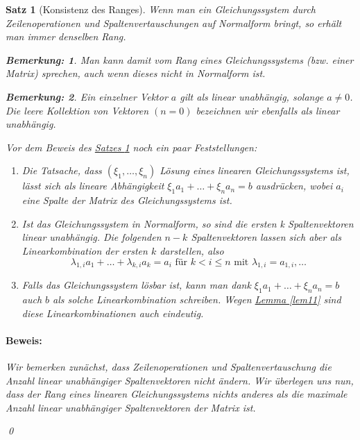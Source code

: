 \documentclass{report}
\newcommand{\lb}{\lambda}
\theoremstyle{customrem}
\newtheorem*{bemerkung}{Bemerkung\textnormal:}
\theoremstyle{customdef}
\newtheorem{satz}[definition]{Satz}
\renewenvironment{proof}{\paragraph{Beweis: }}{\qed}
\theoremstyle{customenv}
\begin{document}
	\begin{satz}[Konsistenz des Ranges]
		\label{satz12}
		Wenn man ein Gleichungssystem durch Zeilenoperationen und Spaltenvertauschungen auf Normalform bringt, so erhält man immer denselben Rang.\\
		
		\begin{bemerkung}
			Man kann damit vom Rang eines Gleichungssystems (bzw. einer Matrix) sprechen, auch wenn dieses nicht in Normalform ist.
		\end{bemerkung}
		\begin{bemerkung}
			Ein einzelner Vektor \(a\) gilt als linear unabhängig, solange \(a \neq 0\). Die leere Kollektion von Vektoren \((n=0)\) bezeichnen wir ebenfalls als linear unabhängig.\\
		\end{bemerkung}
		
		 Vor dem Beweis des \hyperref[satz12]{Satzes \ref*{satz12}} noch ein paar Feststellungen:
		\begin{enumerate}
			\item Die Tatsache, dass \((\xi_1, \ldots, \xi_n)\) Lösung eines linearen Gleichungssystems ist, lässt sich als lineare Abhängigkeit 
			\(\xi_1a_1 + \ldots + \xi_n a_n = b\) ausdrücken, wobei \(a_i\) eine Spalte der Matrix des Gleichungssystems ist.
			\item Ist das Gleichungssystem in Normalform, so sind die ersten k Spaltenvektoren linear unabhängig. Die folgenden \(n-k\) Spaltenvektoren lassen sich aber als Linearkombination der ersten \(k\) darstellen, also
			\[
			\lb_{1,i}a_1 + \ldots + \lb_{k,i}a_k = a_i \text{ für } k < i \le n
			\text{ mit }  \lb_{1,i} = a_{1,i}, \dots
			\]
			\item Falls das Gleichungssystem lösbar ist, kann man dank \(\xi_1a_1 + \ldots + \xi_n a_n = b\) auch \(b\) als solche Linearkombination schreiben. Wegen \hyperref[lem11]{Lemma \ref*{lem11}} sind diese Linearkombinationen auch eindeutig.
		\end{enumerate}
		\begin{proof}
			Wir bemerken zunächst, dass Zeilenoperationen und Spaltenvertauschung die Anzahl linear unabhängiger Spaltenvektoren nicht ändern.
			Wir überlegen uns nun, dass der Rang eines linearen Gleichungssystems nichts anderes als die maximale Anzahl linear unabhängiger Spaltenvektoren der Matrix ist.\linebreak
			

\end{proof}
\end{satz}
\end{document}
